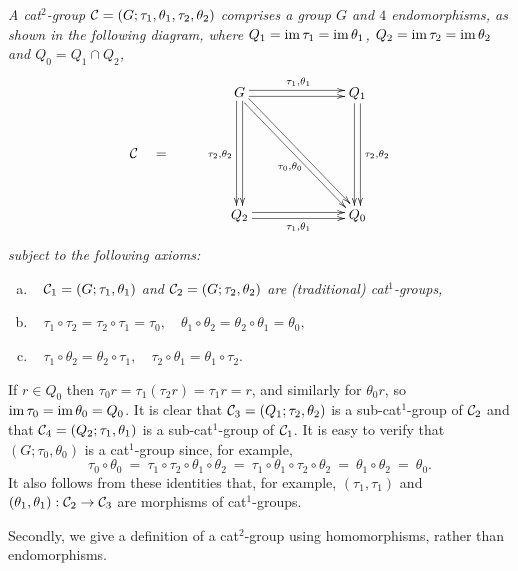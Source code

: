 \begin{defn} \label{defn:cat2a} 
\emph{A cat$^2$-group  $\mathcal{C} = (G;\tau_1,\theta_1,\tau_2,\theta_2)$  
comprises a group $G$ and $4$ endomorphisms, as shown in the following diagram, 
where $Q_1 = \mathrm{im}\,\tau_1 = \mathrm{im}\,\theta_1$, $Q_2 = \mathrm{im}\,\tau_2 = \mathrm{im}\,\theta_2$ 
and $Q_0 = Q_1 \cap Q_2$, }
\begin{equation} \label{eq:cat2-diag-a}
\vcenter{\xymatrix@R=30pt@C=30pt{
 & G \ar[dd] <+0.5ex>  \ar[dd] <-0.5ex>_{\tau_2,\theta_2}
     \ar[rr] <-0.5ex>  \ar[rr] <+0.5ex>^{\tau_1,\theta_1}
     \ar[ddrr] <-0.5ex>  \ar[ddrr] <+0.5ex>_(0.55){\tau_0,\theta_0}
    &&  Q_1 \ar[dd]<-0.5ex>  \ar[dd] <+0.5ex>^{\tau_2,\theta_2} \\ 
\calC \quad = \quad \\
 & Q_2 \ar[rr] <+0.5ex>  \ar[rr] <-0.5ex>_{\tau_1,\theta_1} 
    &&  Q_0 
 \\
}}
\end{equation}
\noindent
\emph{subject to the following axioms:}
\begin{enumerate}[(a)]
\item~
\emph{$\mathcal{C}_1 = (G;\tau_1,\theta_1)$ and $\mathcal{C}_2 = (G;\tau_2,\theta_2)$ 
are (traditional) cat$^1$-groups,}
\item~
$\tau_1 \circ \tau_2 = \tau_2 \circ \tau_1 = \tau_0, \quad  
 \theta_1 \circ \theta_2 = \theta_2 \circ \theta_1 = \theta_0,$  
\item~
$\tau_1 \circ \theta_2 = \theta_2 \circ \tau_1, \quad 
 \tau_2 \circ \theta_1 = \theta_1 \circ \tau_2.$ 
\end{enumerate}
\end{defn}

\noindent
If $r \in Q_0$ then $\tau_0r = \tau_1(\tau_2 r) = \tau_1r = r$, 
and similarly for $\theta_0r$, so $\mathrm{im}\,\tau_0 = \mathrm{im}\,\theta_0 = Q_0$. 
It is clear that $\mathcal{C}_3 = (Q_1;\tau_2,\theta_2)$ 
is a sub-cat$^1$-group of $\mathcal{C}_2$
and that $\mathcal{C}_4 = (Q_2;\tau_1,\theta_1)$ 
is a sub-cat$^1$-group of $\mathcal{C}_1$. 
It is easy to verify that $(G;\tau_0,\theta_0)$ is a cat$^1$-group since, 
for example, 
$$
\tau_0\circ\theta_0 ~=~ \tau_1\circ\tau_2\circ\theta_1\circ\theta_2 
                    ~=~ \tau_1\circ\theta_1\circ\tau_2\circ\theta_2 
                    ~=~ \theta_1\circ\theta_2 
                    ~=~ \theta_0.
$$
It also follows from these identities that, for example,  
$(\tau_1,\tau_1)$ and $(\theta_1,\theta_1) : \mathcal{C}_2 \to \mathcal{C}_3$ 
are morphisms of cat$^1$-groups. %

\medskip 
Secondly, we give a definition of a cat$^2$-group using homomorphisms, 
rather than endomorphisms. 

